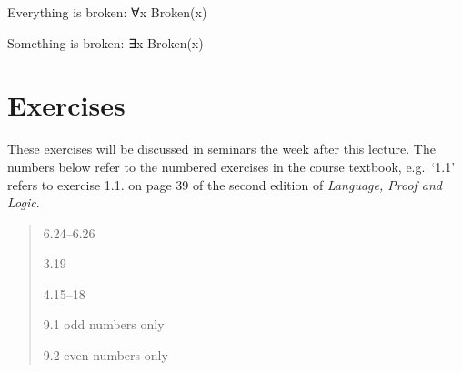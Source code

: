 \documentclass[12pt]{extarticle}
\begin{document}
\begin{multicols*}{3}
Everything is broken: ∀x Broken(x)
 
Something is broken: ∃x Broken(x)
 
\vfill
\begin{minipage}{\columnwidth}
\section{Exercises}
These exercises will be discussed in seminars the week after this lecture.
The numbers below refer to the numbered exercises in the course textbook, e.g.\ `1.1' refers to exercise 1.1. on page 39 of the second edition of \emph{Language, Proof and Logic}.
 
\begin{quote}
6.24--6.26
 
3.19
 
4.15--18
 
9.1 odd numbers only
 
9.2 even numbers only
 
\end{quote}
\end{minipage}
 


\end{multicols*}
\end{document}
